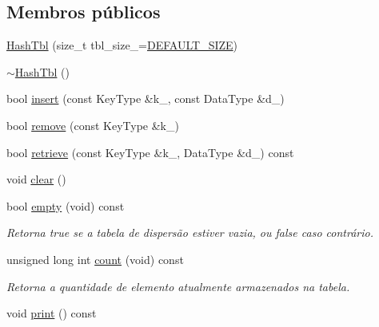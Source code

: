 \subsection*{Membros públicos}
\begin{DoxyCompactItemize}
\item 
\hyperlink{classHashTbl_a8601e6be68360a7845319a6cd32612ee}{Hash\+Tbl} (size\+\_\+t tbl\+\_\+size\+\_\+=\hyperlink{classHashTbl_aeffa5b1a163fb6a09a18fd254a4d6dcf}{D\+E\+F\+A\+U\+L\+T\+\_\+\+S\+I\+ZE})
\item 
\hyperlink{classHashTbl_a20c8c81ad708dba82b1c99cf8b59b97f}{$\sim$\+Hash\+Tbl} ()
\item 
bool \hyperlink{classHashTbl_a5abe7dd52a783fbfa005bcfbb6fdea3e}{insert} (const Key\+Type \&k\+\_\+, const Data\+Type \&d\+\_\+)
\item 
bool \hyperlink{classHashTbl_a8ec97ee89ffce2474fb361f974d5f291}{remove} (const Key\+Type \&k\+\_\+)
\item 
bool \hyperlink{classHashTbl_adbe3cac7c4109dd57627e1f87257202b}{retrieve} (const Key\+Type \&k\+\_\+, Data\+Type \&d\+\_\+) const
\item 
void \hyperlink{classHashTbl_a633936911dbdc769be2dfdae84416e5a}{clear} ()
\item 
bool \hyperlink{classHashTbl_af0a640cbc448ffc7a874ec3ce2a28bd2}{empty} (void) const
\begin{DoxyCompactList}\small\item\em Retorna true se a tabela de dispersão estiver vazia, ou false caso contrário. \end{DoxyCompactList}\item 
unsigned long int \hyperlink{classHashTbl_ad5b97ce68300b96e51cc168bab5bd072}{count} (void) const
\begin{DoxyCompactList}\small\item\em Retorna a quantidade de elemento atualmente armazenados na tabela. \end{DoxyCompactList}\item 
void \hyperlink{classHashTbl_a4b78fa6241832fc1d4d8987df0f4fabe}{print} () const
\end{DoxyCompactItemize}
